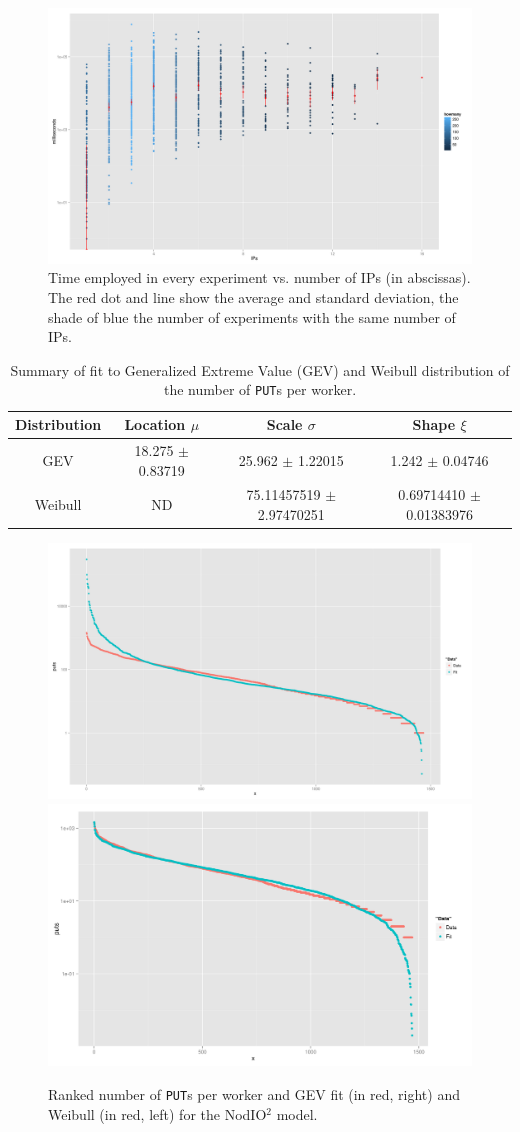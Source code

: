 \documentclass[journal,onecolumn]{IEEEtran}
\begin{document}
\begin{figure}[!htb]
\centering
\includegraphics[width=0.9\linewidth]{ips-time-ww.png}
\caption{Time employed in every experiment vs. number of IPs (in
  abscissas). The red dot and line show the average and standard
  deviation, the shade of blue the number of experiments with the same
  number of IPs. } 
\label{fig:ipstime:w2}
\end{figure}
%
%
\begin{table}
\caption{Summary of fit to Generalized Extreme Value (GEV) and Weibull distribution of
  the number of {\tt PUT}s per worker. \label{tab:puts:ww}}
\begin{center}
\begin{tabular}{cccc}
\hline
Distribution & Location $\mu$ & Scale $\sigma$ & Shape $\xi$ \\
\hline
GEV & 18.275 $\pm$ 0.83719  &  25.962  $\pm$ 1.22015 & 1.242   $\pm$
0.04746 \\
Weibull & ND & 75.11457519 $\pm$ 2.97470251  & 0.69714410 $\pm$ 0.01383976 \\
\hline
\end{tabular}
\end{center}
\end{table}
%
\begin{figure}[!htb]
\centering
\includegraphics[width=0.49\linewidth]{gev-fit-ww.png}
\includegraphics[width=0.49\linewidth]{weibull-fit-ww.png}
\caption{Ranked number of {\tt PUT}s per worker and GEV fit (in red, right) and Weibull (in red, left) for the {\sf NodIO$^2$} model.}  
\label{fig:gev:w2}
\end{figure}
\end{document}
